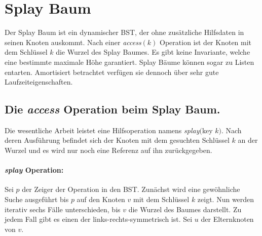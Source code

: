\documentclass[a4paper,12pt]{article}
\begin{document}
\section{Splay Baum}
Der  Splay Baum \cite{splay} ist ein dynamischer BST, der ohne zusätzliche Hilfsdaten in seinen Knoten auskommt. Nach einer \textit{access}$\left(k\right)$ Operation ist der Knoten mit dem Schlüssel $k$ die Wurzel des Splay Baumes. Es gibt keine Invariante, welche eine bestimmte maximale Höhe garantiert. Splay Bäume können sogar zu Listen entarten. Amortisiert betrachtet verfügen sie dennoch über sehr gute Laufzeiteigenschaften. 


\subsection{Die \textit{access} Operation beim Splay Baum. }
Die wesentliche Arbeit leistet eine Hilfsoperation namens \textit{splay}$($key $k)$. Nach deren Ausführung befindet sich der Knoten mit dem gesuchten Schlüssel $k$ an der Wurzel und es wird nur noch eine Referenz auf ihn zurückgegeben.

\paragraph{\textit{splay} Operation:}
Sei $p$ der Zeiger der Operation in den BST. Zunächst wird eine gewöhnliche Suche ausgeführt bis $p$ auf den Knoten $v$ mit dem Schlüssel $k$ zeigt. Nun werden iterativ sechs Fälle unterschieden, bis $v$ die Wurzel des Baumes darstellt. Zu jedem Fall gibt es einen der links-rechts-symmetrisch ist. Sei $u$ der Elternknoten von $v$. 
\end{document}

